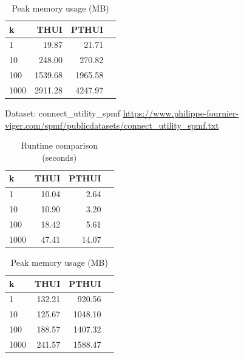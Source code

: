 \begin{table}[H]
\caption{Peak memory usage (MB)}\label{tab:memory}
\centering
\begin{tabular}{@{}lrrr@{}}
\toprule
\textbf{k} & \textbf{THUI} & \textbf{PTHUI} \\
\midrule
1  & 19.87 & 21.71 \\
10 & 248.00 & 270.82 \\
100 & 1539.68 & 1965.58 \\
1000 & 2911.28 & 4247.97 \\
\bottomrule
\end{tabular}
\end{table}

Dataset: connect\_utility\_spmf
\url{https://www.philippe-fournier-viger.com/spmf/publicdatasets/connect_utility_spmf.txt}

\begin{table}[H]
\caption{Runtime comparison (seconds)}\label{tab:runtime}
\centering
\begin{tabular}{@{}lrrr@{}}
\toprule
\textbf{k} & \textbf{THUI} & \textbf{PTHUI}\\
\midrule
1 & 10.04 & 2.64 \\
10 & 10.90 & 3.20 \\
100 & 18.42 & 5.61 \\
1000 & 47.41 & 14.07 \\
\bottomrule
\end{tabular}
\end{table}

\begin{table}[H]
\caption{Peak memory usage (MB)}\label{tab:memory}
\centering
\begin{tabular}{@{}lrrr@{}}
\toprule
\textbf{k} & \textbf{THUI} & \textbf{PTHUI} \\
\midrule
1  & 132.21 & 920.56 \\
10 & 125.67 & 1048.10 \\
100 & 188.57 & 1407.32 \\
1000 & 241.57 & 1588.47 \\
\bottomrule
\end{tabular}
\end{table}

